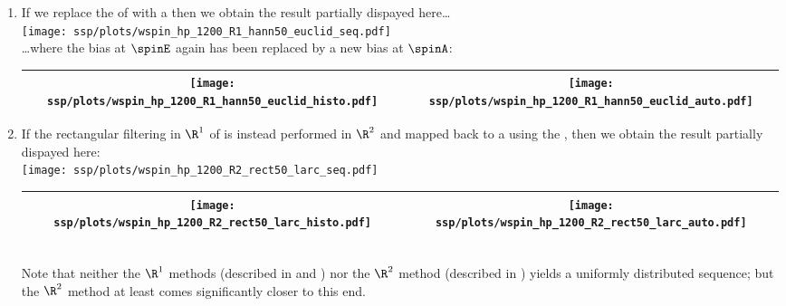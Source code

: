 \begin{example}
\begin{enumerate}
  \item \label{item:wspin_hp_hann50}\label{item:wspin_hp_hann50_R1}
        If we replace the  of 
        with a 
        then we obtain the result partially dispayed here\ldots
          \\\texttt{[image: ssp/plots/wspin\_hp\_1200\_R1\_hann50\_euclid\_seq.pdf]}\\
        \ldots where the bias at $\spinE$ again has been replaced by a new bias at $\spinA$:
          \\\begin{tabular}{|>{\scs}c|>{\scs}c|}
               \hline
               \texttt{[image: ssp/plots/wspin\_hp\_1200\_R1\_hann50\_euclid\_histo.pdf]}
              &\texttt{[image: ssp/plots/wspin\_hp\_1200\_R1\_hann50\_euclid\_auto.pdf]}
             \\\hline
          \end{tabular}


  \item \label{item:wspin_hp_rect50_R2_larc}
        If the rectangular filtering in $\R^1$ of 
        is instead performed in $\R^2$ 
        and mapped back to a  using the ,
        then we obtain the result partially dispayed here:
        \\\texttt{[image: ssp/plots/wspin\_hp\_1200\_R2\_rect50\_larc\_seq.pdf]}
        \\\begin{tabular}{|>{\scs}c|>{\scs}c|}
             \hline
             \texttt{[image: ssp/plots/wspin\_hp\_1200\_R2\_rect50\_larc\_histo.pdf]}
            &\texttt{[image: ssp/plots/wspin\_hp\_1200\_R2\_rect50\_larc\_auto.pdf]}
           \\\hline
        \end{tabular}\\
        Note that neither the $\R^1$ methods 
        (described in  and )
        nor the $\R^2$ method (described in )
        yields a uniformly distributed sequence; 
        but the $\R^2$ method at least comes significantly closer to this end.


\end{enumerate}
\end{example}
